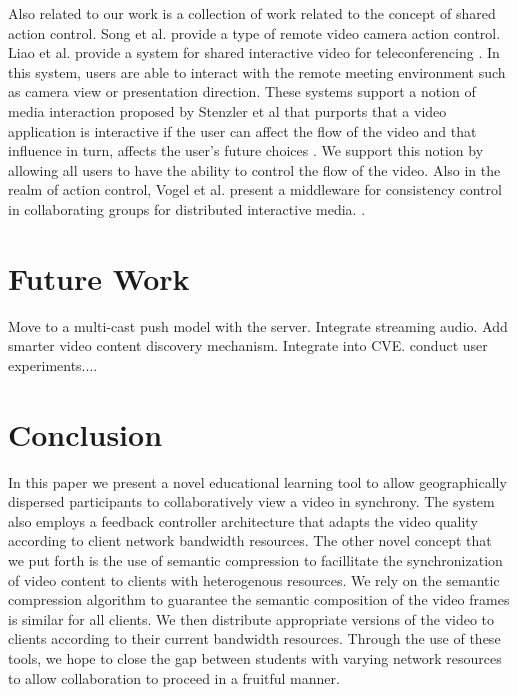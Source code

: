 \documentclass{sig-alternate}
\begin{document}
Also related to our work is a collection of work related to the
concept of shared action control.  Song et al. \cite{SONG} provide a
type of remote video camera action control.  Liao et al. provide a
system for shared interactive video for teleconferencing \cite{LIAO}.
In this system, users are able to interact with the remote meeting
environment such as camera view or presentation direction.  These
systems support a notion of media interaction proposed by Stenzler et
al that purports that a video application is interactive if the user
can affect the flow of the video and that influence in turn, affects
the user's future choices \cite{STENZLER}.  We support this notion by
allowing all users to have the ability to control the flow of the
video.  Also in the realm of action control, Vogel et al. present a
middleware for consistency control in collaborating groups for
distributed interactive media.  \cite{VOGEL}.

%

\section{Future Work} \label{con}
Move to a multi-cast push model with the server.  Integrate streaming
audio.  Add smarter video content discovery mechanism.  Integrate into
CVE.  conduct user experiments....


\section{Conclusion}

In this paper we present a novel educational learning tool to allow
geographically dispersed participants to collaboratively view a video
in synchrony.  The system also employs a feedback controller
architecture that adapts the video quality according to client network
bandwidth resources.  The other novel concept that we put forth is the
use of semantic compression to facillitate the synchronization of
video content to clients with heterogenous resources.  We rely on the
semantic compression algorithm to guarantee the semantic composition
of the video frames is similar for all clients.  We then distribute
appropriate versions of the video to clients according to their
current bandwidth resources.  Through the use of these tools, we hope
to close the gap between students with varying network resources to
allow collaboration to proceed in a fruitful manner.
\end{document}
